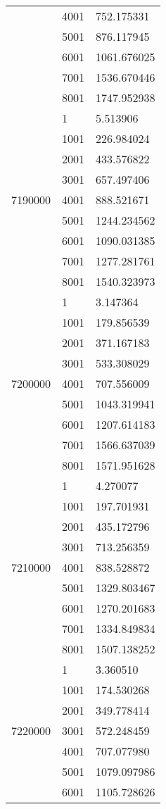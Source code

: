 \begin{table}[htb!]
\begin{tabular}{lll}
 & 4001 & 752.175331 \\
 & 5001 & 876.117945 \\
 & 6001 & 1061.676025 \\
 & 7001 & 1536.670446 \\
 & 8001 & 1747.952938 \\
\multirow[c]{9}{*}{7190000} & 1 & 5.513906 \\
 & 1001 & 226.984024 \\
 & 2001 & 433.576822 \\
 & 3001 & 657.497406 \\
 & 4001 & 888.521671 \\
 & 5001 & 1244.234562 \\
 & 6001 & 1090.031385 \\
 & 7001 & 1277.281761 \\
 & 8001 & 1540.323973 \\
\multirow[c]{9}{*}{7200000} & 1 & 3.147364 \\
 & 1001 & 179.856539 \\
 & 2001 & 371.167183 \\
 & 3001 & 533.308029 \\
 & 4001 & 707.556009 \\
 & 5001 & 1043.319941 \\
 & 6001 & 1207.614183 \\
 & 7001 & 1566.637039 \\
 & 8001 & 1571.951628 \\
\multirow[c]{9}{*}{7210000} & 1 & 4.270077 \\
 & 1001 & 197.701931 \\
 & 2001 & 435.172796 \\
 & 3001 & 713.256359 \\
 & 4001 & 838.528872 \\
 & 5001 & 1329.803467 \\
 & 6001 & 1270.201683 \\
 & 7001 & 1334.849834 \\
 & 8001 & 1507.138252 \\
\multirow[c]{9}{*}{7220000} & 1 & 3.360510 \\
 & 1001 & 174.530268 \\
 & 2001 & 349.778414 \\
 & 3001 & 572.248459 \\
 & 4001 & 707.077980 \\
 & 5001 & 1079.097986 \\
 & 6001 & 1105.728626 \\

\end{tabular}
\end{table}
